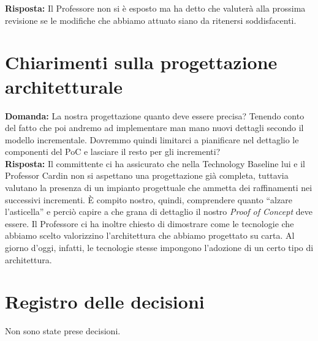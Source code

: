 \documentclass{article}
\begin{document}
\textbf{Risposta:} Il Professore non si è esposto ma ha detto che valuterà alla prossima revisione se le modifiche che abbiamo attuato siano da ritenersi soddisfacenti.

\section{Chiarimenti sulla progettazione architetturale}%
\label{sec:chiarimenti_sulla_progettazione_architetturale}

\textbf{Domanda:} La nostra progettazione quanto deve essere precisa? Tenendo conto del fatto che poi andremo ad implementare man mano nuovi dettagli secondo il modello incrementale. Dovremmo quindi limitarci a pianificare nel dettaglio le componenti del PoC e lasciare il resto per gli incrementi?\\

\textbf{Risposta:} Il committente ci ha assicurato che nella Technology Baseline lui e il Professor Cardin non si aspettano una progettazione già completa, tuttavia valutano la presenza di un impianto progettuale che ammetta dei raffinamenti nei successivi incrementi.
È compito nostro, quindi, comprendere quanto ``alzare l'asticella'' e perciò capire a che grana di dettaglio il nostro \textit{Proof of Concept} deve essere.
Il Professore ci ha inoltre chiesto di dimostrare come le tecnologie che abbiamo scelto valorizzino l'architettura che abbiamo progettato su carta.
Al giorno d'oggi, infatti, le tecnologie stesse impongono l'adozione di un certo tipo di architettura.

\newpage
\section{Registro delle decisioni}%
\label{sec:registro_delle_decisioni}

Non sono state prese decisioni.
\end{document}
